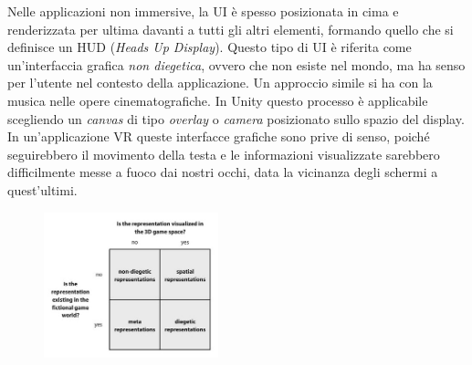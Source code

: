 Nelle applicazioni non immersive, la UI è spesso posizionata in cima e renderizzata per ultima davanti a tutti gli altri elementi, formando quello che si definisce un HUD (\textit{Heads Up Display}). Questo tipo di UI è riferita come un'interfaccia grafica \textit{non diegetica}, ovvero che non esiste nel mondo, ma ha senso per l'utente nel contesto della applicazione. Un approccio simile si ha con la musica nelle opere cinematografiche. In Unity questo processo è applicabile scegliendo un \textit{canvas}  di tipo \textit{overlay} o \textit{camera} posizionato sullo spazio del display. In un'applicazione VR queste interfacce grafiche sono prive di senso, poiché seguirebbero il movimento della testa e le informazioni visualizzate sarebbero difficilmente messe a fuoco dai nostri occhi, data la vicinanza degli schermi a quest'ultimi.\\

\begin{figure} %
	\centering
	\includegraphics[width=0.45\textwidth]{figure/diegetic}

\end{figure}


